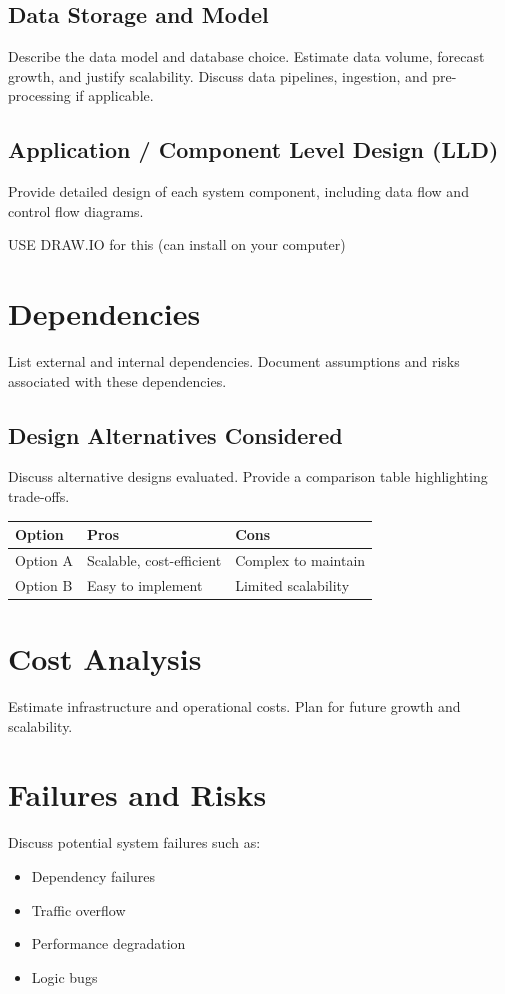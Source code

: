 \documentclass[12pt,a4paper]{article}
\begin{document}
\subsection{Data Storage and Model}
Describe the data model and database choice.  
Estimate data volume, forecast growth, and justify scalability.  
Discuss data pipelines, ingestion, and pre-processing if applicable.

\subsection{Application / Component Level Design (LLD)}
Provide detailed design of each system component, including data flow and control flow diagrams.

USE DRAW.IO for this (can install on your computer)

\newpage
\section{Dependencies}
List external and internal dependencies.  
Document assumptions and risks associated with these dependencies.
\subsection{Design Alternatives Considered}
Discuss alternative designs evaluated.  
Provide a comparison table highlighting trade-offs.

\begin{longtable}{@{}p{3cm}p{5cm}p{5cm}@{}}
\toprule
\textbf{Option} & \textbf{Pros} & \textbf{Cons} \\ \midrule
Option A & Scalable, cost-efficient & Complex to maintain \\
Option B & Easy to implement & Limited scalability \\ \bottomrule
\end{longtable}

\newpage
\section{Cost Analysis}
Estimate infrastructure and operational costs.  
Plan for future growth and scalability.

\newpage
\section{Failures and Risks}
Discuss potential system failures such as:
\begin{itemize}
  \item Dependency failures
  \item Traffic overflow
  \item Performance degradation
  \item Logic bugs
\end{itemize}
\end{document}

